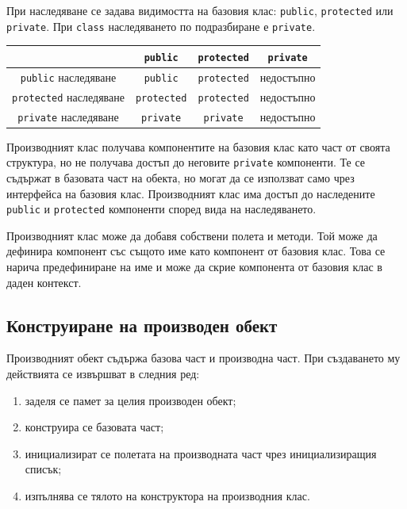При наследяване се задава видимостта на базовия клас: \texttt{public}, \texttt{protected} или \texttt{private}. При \texttt{class} наследяването по подразбиране е \texttt{private}.

\begin{center}
\begin{tabular}{c|ccc}
 & \texttt{public} & \texttt{protected} & \texttt{private}\\
\hline
\texttt{public} наследяване & \texttt{public} & \texttt{protected} & недостъпно\\
\texttt{protected} наследяване & \texttt{protected} & \texttt{protected} & недостъпно\\
\texttt{private} наследяване & \texttt{private} & \texttt{private} & недостъпно
\end{tabular}
\end{center}

Производният клас получава компонентите на базовия клас като част от своята структура, но не получава достъп до неговите \texttt{private} компоненти. Те се съдържат в базовата част на обекта, но могат да се използват само чрез интерфейса на базовия клас. Производният клас има достъп до наследените \texttt{public} и \texttt{protected} компоненти според вида на наследяването.

Производният клас може да добавя собствени полета и методи. Той може да дефинира компонент със същото име като компонент от базовия клас. Това се нарича предефиниране на име и може да скрие компонента от базовия клас в даден контекст.

\subsection{Конструиране на производен обект}\label{s:16.3.1}

Производният обект съдържа базова част и производна част. При създаването му действията се извършват в следния ред:

\begin{enumerate}
    \item заделя се памет за целия производен обект;
    \item конструира се базовата част;
    \item инициализират се полетата на производната част чрез инициализиращия списък;
    \item изпълнява се тялото на конструктора на производния клас.
\end{enumerate}

